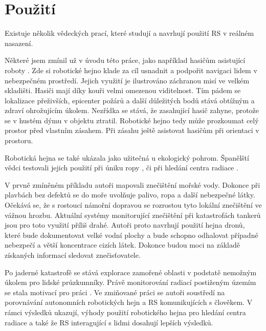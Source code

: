 \section{Použití}
Existuje několik vědeckých prací, které studují a navrhují použití RS v reálném nasazení. 
\par 
Některé jsem zmínil už v úvodu této práce, jako například hasičům asistující roboty \citep{fireRobots}.  Zde si robotické hejno klade za cíl usnadnit a podpořit navigaci lidem v nebezpečném prostředí. Jejich využití je ilustrováno záchranou misí ve velkém skladišti. Hasiči mají díky kouři velmi omezenou viditelnost. Tím pádem se lokalizace přeživších, epicenter požárů a další důležitých bodů stává obtížným a zdraví ohrožujícím úkolem. Nezřídka se stává, že zasahující hasič zahyne, protože se v hustém dýmu v objektu ztratil. Robotické hejno tedy může prozkoumat celý prostor před vlastním zásahem. Při zásahu ještě asistovat hasičům při orientaci v prostoru. 
\par
Robotická hejna se také ukázala jako užitečná u ekologický pohrom. Španělští vědci testovali jejich použití při úniku ropy \citep{oilSwarm}, či při hledání centra radiace \citep{radiationSwarm}. 
\par 
V prvně zmíněném příkladu autoři mapovali znečištění mořské vody. Dokonce při plavbách bez defektů se do moře uvolňuje palivo, ropa a další nebezpečné látky. Očekává se, že s rostoucí námořní dopravou se rozrostou tyto lokální znečištění ve vážnou hrozbu. Aktuální systémy monitorující znečištění při katastrofách tankerů jsou pro toto využití příliš drahé. Autoři proto navrhují použití hejna dronů, které bude dokumentovat velké vodní plochy a bude schopno odhalovat případné nebezpečí a větší koncentrace cizích látek. Dokonce budou moci na základě získaných informací sledovat znečisťovatele. 
\par
Po jaderné katastrofě se stává explorace zamořené oblasti  v podstatě nemožným úkolem pro lidské průzkumníky. Právě monitorování radiací postiženým územím se stala motivací pro práci \citep{radiationSwarm}. Ve zmiňované práci se autoři soustředí na porovnávání autonomních robotických hejn a RS komunikujících s člověkem. V rámci výsledků ukazují, výhody použití robotického hejna pro hledání centra radiace a také že RS interagující s lidmi dosahují lepších výsledků.
\par
